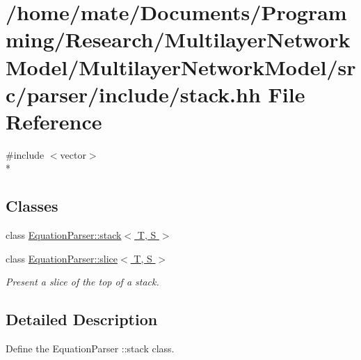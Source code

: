 \hypertarget{stack_8hh}{}\section{/home/mate/\+Documents/\+Programming/\+Research/\+Multilayer\+Network\+Model/\+Multilayer\+Network\+Model/src/parser/include/stack.hh File Reference}
\label{stack_8hh}
{\ttfamily \#include $<$vector$>$}\\*
\subsection*{Classes}
\begin{DoxyCompactItemize}
\item 
class \hyperlink{classEquationParser_1_1stack}{Equation\+Parser\+::stack$<$ T, S $>$}
\item 
class \hyperlink{classEquationParser_1_1slice}{Equation\+Parser\+::slice$<$ T, S $>$}
\begin{DoxyCompactList}\small\item\em Present a slice of the top of a stack. \end{DoxyCompactList}\end{DoxyCompactItemize}


\subsection{Detailed Description}
Define the Equation\+Parser \+::stack class. 